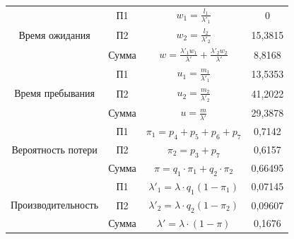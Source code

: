 \begin{tabular}{|c|c|c|c|}
\multirow{3}{*}{Время ожидания}     & П1     & $w_1=\frac{l_1}{\lambda'_1}$                                            & 0        \\ \cline{2-4}
                                    & П2     & $w_2=\frac{l_2}{\lambda'_2}$                                            & 15,3815  \\ \cline{2-4}
                                    & Сумма  & $w = \frac{\lambda'_1 w_1}{\lambda'} + \frac{\lambda'_2 w_2}{\lambda'}$ & 8,8168   \\ \hline
\multirow{3}{*}{Время пребывания}   & П1     & $u_1 = \frac{m_1}{\lambda'_1}$                                          & 13,5353  \\ \cline{2-4}
                                    & П2     & $u_2 = \frac{m_2}{\lambda'_2}$                                          & 41,2022  \\ \cline{2-4}
                                    & Сумма  & $u = \frac{m}{\lambda'}$                                                & 29,3878  \\ \hline
\multirow{3}{*}{Вероятность потери} & П1     & $\pi_1 = p_4 + p_5 + p_6 + p_7$                                         & 0,7142   \\ \cline{2-4}
                                    & П2     & $\pi_2 = p_3 + p_7$                                                     & 0,6157   \\ \cline{2-4}
                                    & Сумма  & $\pi = q_1 \cdot \pi_1 + q_2 \cdot \pi_2$                               & 0,66495  \\ \hline
\multirow{3}{*}{Производительность} & П1     & $\lambda'_1 = \lambda \cdot q_1(1 - \pi_1)$                             & 0,07145  \\ \cline{2-4}
                                    & П2     & $\lambda'_2 = \lambda \cdot q_2(1 - \pi_2)$                             & 0,09607  \\ \cline{2-4}
                                    & Сумма  & $\lambda' = \lambda \cdot (1 - \pi)$                                    & 0,1676   \\ \hline
\end{tabular}


